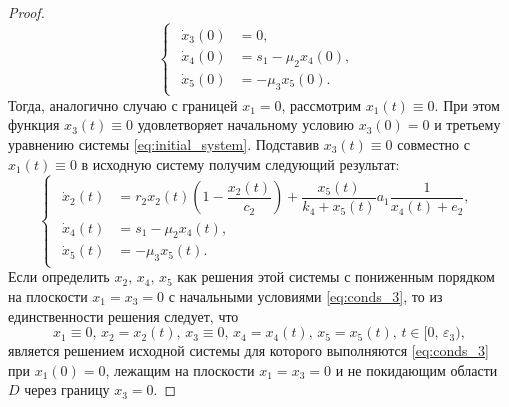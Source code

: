 \documentclass[14pt,a4paper]{extarticle}
\begin{document}
\begin{proof}
\begin{equation*}
\begin{cases}
\begin{aligned}
					\dot{x}_3(0) &= 0,\\
					\dot{x}_4(0) &= s_1 - \mu_2x_4(0),\\
					\dot{x}_5(0) &= -\mu_3x_5(0).
				\end{aligned}
			\end{cases}
		\end{equation*}
		Тогда, аналогично случаю с границей $x_1=0$, рассмотрим $x_1(t)\equiv0$. При этом функция $x_3(t)\equiv0$ удовлетворяет начальному условию $x_3(0)=0$ и третьему уравнению системы \ref{eq:initial_system}. Подставив $x_3(t)\equiv0$ совместно с $x_1(t)\equiv0$ в исходную систему получим следующий результат:
		\begin{equation*}
			\begin{cases}
				\begin{aligned}
					\dot{x}_2(t) &= r_2x_2(t)\left(1-\dfrac{x_2(t)}{c_2}\right)+\dfrac{x_5(t)}{k_4+x_5(t)}a_1\dfrac{1}{x_4(t)+e_2},\\
					\dot{x}_4(t) &= s_1-\mu_2x_4(t),\\
					\dot{x}_5(t) &= -\mu_3x_5(t).
				\end{aligned}
			\end{cases}
		\end{equation*}
		Если определить $x_2,\, x_4,\, x_5$ как решения этой системы с пониженным порядком на плоскости $x_1=x_3=0$ с начальными условиями \ref{eq:conds_3}, то из единственности решения следует, что
		\[x_1\equiv0,\, x_2=x_2(t),\, x_3\equiv0,\, x_4=x_4(t),\, x_5=x_5(t),\, t\in[0,\,\varepsilon_3),\]
		является решением исходной системы для которого выполняются \ref{eq:conds_3} при $x_1(0)=0$, лежащим на плоскости $x_1=x_3=0$ и не покидающим области~$D$ через границу $x_3=0$.
	

\end{proof}
\end{document}
